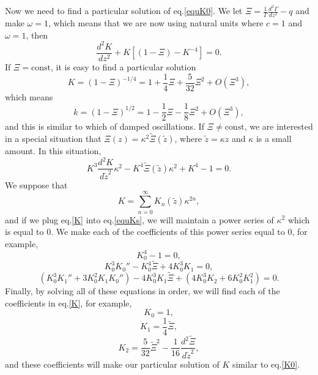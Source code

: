 \documentclass[
 jor,
 amsmath,amssymb,preprint,
]{revtex4-2}
\begin{document}
Now we need to find a particular solution of eq.\eqref{equK0}. We let $\Xi=\frac{1}{\Gamma}\frac{d^2\Gamma}{d z^2}-q$ and make $\omega=1$, which means that we are now using natural units where $c=1$ and $\omega=1$, then
\begin{equation}\label{equK}
    \frac{d^2 K}{d z^2}+K[(1-\Xi)-K^{-4}]=0.
\end{equation}
If $\Xi=\text{const}$, it is easy to find a particular solution
\begin{equation}\label{K0}
    K=(1-\Xi)^{-1/4}=1+\frac{1}{4}\Xi+\frac{5}{32}\Xi^2+O(\Xi^3),
\end{equation}
which means
\begin{equation}
    k=(1-\Xi)^{1/2}=1-\frac{1}{2}\Xi-\frac{1}{8}\Xi^2+O(\Xi^3),
\end{equation}
and this is similar to which of damped oscillations. If $\Xi\neq\text{const}$, we are interested in a special situation that $\Xi(z)=\kappa^2\tilde{\Xi}(\tilde{z})$, where $\tilde{z}=\kappa z$ and $\kappa$ is a small amount. In this situation,
\begin{equation}\label{equKs}
    K^3\frac{d^2 K}{d \tilde{z}^2}\kappa^2-K^4\tilde{\Xi}(\tilde{z})\kappa^2+K^4-1=0.
\end{equation}
We suppose that
\begin{equation}\label{K}
    K=\sum_{n=0}^\infty K_n(\tilde{z})\kappa^{2n},
\end{equation}
and if we plug eq.\eqref{K} into eq.\eqref{equKs}, we will maintain a power series of $\kappa^2$ which is equal to $0$. We make each of the coefficients of this power series equal to $0$, for example,
\begin{equation}
    K_0^4-1=0,
\end{equation}
\begin{equation}
    K_0^3K_0''-K_0^4\tilde{\Xi}+4K_0^3K_1=0,
\end{equation}
\begin{equation}
    (K_0^3K_1''+3K_0^2K_1K_0'')-4K_0^3K_1\tilde{\Xi}+(4K_0^3K_2+6K_0^2K_1^2)=0.
\end{equation}
Finally, by solving all of these equations in order, we will find each of the coefficients in eq.\eqref{K}, for example,
\begin{equation}
    K_0=1,
\end{equation}
\begin{equation}
    K_1=\frac{1}{4}\tilde{\Xi},
\end{equation}
\begin{equation}
    K_2=\frac{5}{32}\tilde{\Xi}^2-\frac{1}{16}\frac{d^2\tilde{\Xi}}{d\tilde{z}^2},
\end{equation}
and these coefficients will make our particular solution of $K$ similar to eq.\eqref{K0}.
\end{document}
